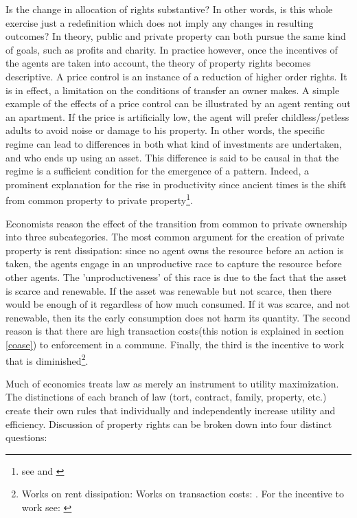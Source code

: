 Is the change in allocation of rights substantive? In other words, is this whole exercise just a redefinition which does not imply any changes in resulting outcomes? In theory, public and private property can both pursue the same kind of goals, such as profits and charity. In practice however, once the incentives of the agents are taken into account, the theory of property rights becomes descriptive. A price control is an instance of a reduction of higher order rights. It is in effect, a limitation on the conditions of transfer an owner makes. A simple example of the effects of a price control can be illustrated by an agent renting out an apartment. If the price is artificially low, the agent will prefer childless/petless adults to avoid noise or damage to his property. In other words, the specific regime can lead to differences in both what kind of investments are undertaken, and who ends up using an asset. This difference is said to be causal in that the regime is a sufficient condition for the emergence of a pattern. Indeed, a prominent explanation for the rise in productivity since ancient times is the shift from common property to private property\footnote{see \cite{anderson1983privatizing} and \cite{north1973rise}}.

Economists reason the effect of the transition from common to private ownership into three subcategories. The most common argument for the creation of private property is rent dissipation: since no agent owns the resource before an action is taken, the agents engage in an unproductive race to capture the resource before other agents. The 'unproductiveness' of this race is due to the fact that the asset is scarce and renewable. If the asset was renewable but not scarce, then there would be enough of it regardless of how much consumed. If it was scarce, and not renewable, then its the early consumption does not harm its quantity. The second reason is that there are high transaction costs(this notion is explained in section \ref{coase}) to enforcement in a commune. Finally, the third is the incentive to work that is diminished\footnote{ Works on rent dissipation:\cite{dasgupta1979economic} \cite{gordon1954economic} \cite{Cheung1970} \cite{schaefer1957some} \cite{scott1955fishery} \cite{clark1990optimal} Works on transaction costs: \cite{coase1960problem} \cite{demsetz1983structure}. For the incentive to work see: \cite{north1990} }.

Much of economics treats law as merely an instrument to utility maximization. The distinctions of each branch of law (tort, contract, family, property, etc.) create their own rules that individually and independently increase utility and efficiency. Discussion of property rights can be broken down into four distinct questions:

